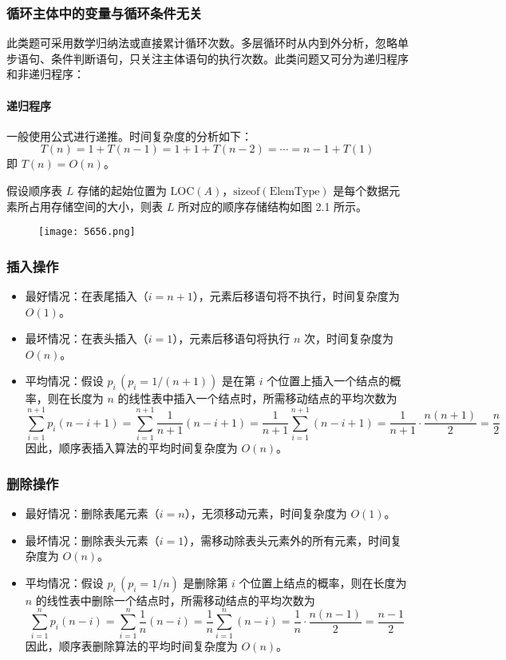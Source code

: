 \documentclass[UTF8]{ctexart}
\begin{document}
	
	\subsubsection{循环主体中的变量与循环条件无关}
	
	此类题可采用数学归纳法或直接累计循环次数。多层循环时从内到外分析，忽略单步语句、条件判断语句，只关注主体语句的执行次数。此类问题又可分为递归程序和非递归程序：
	
	\paragraph{递归程序}一般使用公式进行递推。时间复杂度的分析如下：  
	\[ T(n) = 1 + T(n - 1) = 1 + 1 + T(n - 2) = \cdots = n - 1 + T(1) \]  
	即 \( T(n) = O(n) \)。
	
	
	假设顺序表 \( L \) 存储的起始位置为 \( \text{LOC}(A) \)，\(\text{sizeof}(\text{ElemType})\) 是每个数据元素所占用存储空间的大小，则表 \( L \) 所对应的顺序存储结构如图 2.1 所示。
	
	\begin{figure}[h]
		\centering
		\centering
		\label{fig:ttttt}
		\texttt{[image: 5656.png]}
	\end{figure}
	
	
	\subsubsection{插入操作}
	\begin{itemize}
		\item 最好情况：在表尾插入（\( i = n + 1 \)），元素后移语句将不执行，时间复杂度为 \( O(1) \)。
		\item 最坏情况：在表头插入（\( i = 1 \)），元素后移语句将执行 \( n \) 次，时间复杂度为 \( O(n) \)。
		\item 平均情况：假设 \( p_i \, (p_i = 1 / (n + 1)) \) 是在第 \( i \) 个位置上插入一个结点的概率，则在长度为 \( n \) 的线性表中插入一个结点时，所需移动结点的平均次数为  
		\[
		\sum_{i=1}^{n+1} p_i (n - i + 1) = \sum_{i=1}^{n+1} \frac{1}{n + 1} (n - i + 1) = \frac{1}{n + 1} \sum_{i=1}^{n+1} (n - i + 1) = \frac{1}{n + 1} \cdot \frac{n(n + 1)}{2} = \frac{n}{2}
		\]  
		因此，顺序表插入算法的平均时间复杂度为 \( O(n) \)。
	\end{itemize}
	\subsubsection{删除操作}
	\begin{itemize}
		\item 最好情况：删除表尾元素（\( i = n \)），无须移动元素，时间复杂度为 \( O(1) \)。
		\item 最坏情况：删除表头元素（\( i = 1 \)），需移动除表头元素外的所有元素，时间复杂度为 \( O(n) \)。
		\item 平均情况：假设 \( p_i \, (p_i = 1 / n) \) 是删除第 \( i \) 个位置上结点的概率，则在长度为 \( n \) 的线性表中删除一个结点时，所需移动结点的平均次数为  
		\[
		\sum_{i=1}^{n} p_i (n - i) = \sum_{i=1}^{n} \frac{1}{n} (n - i) = \frac{1}{n} \sum_{i=1}^{n} (n - i) = \frac{1}{n} \cdot \frac{n(n - 1)}{2} = \frac{n - 1}{2}
		\]  
		因此，顺序表删除算法的平均时间复杂度为 \( O(n) \)。
	\end{itemize}
	
\end{document}
